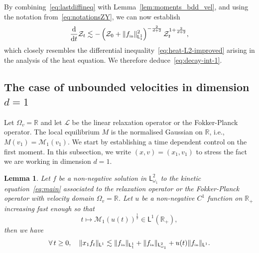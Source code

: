 \documentclass[11pt]{amsart}
\newtheorem{lemma}[theorem]{Lemma}
\theoremstyle{definition}
\theoremstyle{remark}
\numberwithin{equation}{section}
\newcommand\R{{\mathbb R}}
\def\ZZ{{\mathcal Z}}
\def\MMM{{\mathscr M}}
\newcommand{\dt}{\frac{{\rm d}}{{\rm d}t}}
\newcommand{\init}{\text{{\tiny {\rm in}}}}
\newcommand{\sfL}{\mathsf{L}}
\begin{document}
By combining~\eqref{eq:lastdiffineq} with Lemma~\ref{lem:moments_bdd_vel}, and using the notation from~\eqref{eq:notationsZY}, we can now establish
\begin{equation}
  \label{eq:diffineq-bddcase}
  \dt \ZZ_t \lesssim - \left(\ZZ_0 + \| f_\init \|_{\sfL^{1}_1}^2 \right)^{-\frac{2}{d+2}} \ZZ_t^{1 + \frac{2}{d+2}},
\end{equation}
which closely resembles the differential inequality~\eqref{eq:heat-L2-improved} arising in the analysis of the heat equation. We therefore deduce~\eqref{eq:decay-int-1}.

\subsection{The case of unbounded velocities in dimension $d=1$} \label{subsec:Moment-unbddvelocities-d1}

Let $\Omega_v = \R$ and let $\mathcal L$ be the linear relaxation operator or the Fokker-Planck operator. The local equilibrium $M$ is the normalised Gaussian on $\R$, i.e., $M(v_1) =  \MMM_1(v_1)$. We start by establishing a time dependent control on the first moment. In this subsection, we write $(x,v) = (x_1,v_1)$ to stress the fact we are working in dimension $d=1$.

\begin{lemma}\label{lem:moments_unbdd_vel}
  Let $f$ be a non-negative solution in $\sfL^2_{\omega_1}$ to the kinetic equation~\eqref{eq:main} associated to  the relaxation operator or the Fokker-Planck operator with velocity domain $\Omega_v = \R$. Let $u$ be a non-negative $C^1$ function on $\R_+$ increasing fast enough so that
  \begin{equation}
    \label{eq:hyp-u}
    t \mapsto \MMM_1(u(t))^{\frac{1}{2}} \in \sfL^1(\R_+),
  \end{equation}
  then we have
  \begin{equation}\label{eq:lem:moment2}
    \forall \, t \ge 0, \quad \| x_1 f_t \|_{\sfL^{1}} \lesssim
    \| f_\init \|_{\sfL^1_1} +  \| f_\init \|_{\sfL^2_{\omega_1}} + u(t) \| f_\init \|_{\sfL^1}.
  \end{equation}
\end{lemma}
\end{document}
